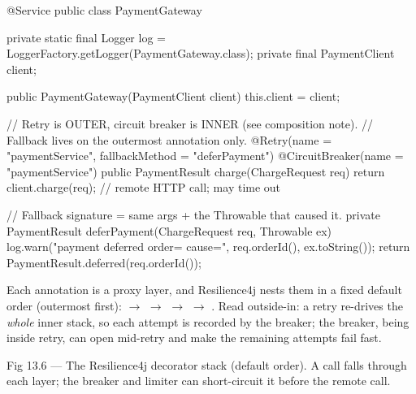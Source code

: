 \begin{javabox}
@Service
public class PaymentGateway {

  private static final Logger log =
      LoggerFactory.getLogger(PaymentGateway.class);
  private final PaymentClient client;

  public PaymentGateway(PaymentClient client) {
    this.client = client;
  }

  // Retry is OUTER, circuit breaker is INNER (see composition note).
  // Fallback lives on the outermost annotation only.
  @Retry(name = "paymentService", fallbackMethod = "deferPayment")
  @CircuitBreaker(name = "paymentService")
  public PaymentResult charge(ChargeRequest req) {
    return client.charge(req);   // remote HTTP call; may time out
  }

  // Fallback signature = same args + the Throwable that caused it.
  private PaymentResult deferPayment(ChargeRequest req, Throwable ex) {
    log.warn("payment deferred order={} cause={}",
             req.orderId(), ex.toString());
    return PaymentResult.deferred(req.orderId());
  }
}
\end{javabox}

 Each annotation is a proxy layer, and Resilience4j nests them in a fixed default order (outermost first):  $\rightarrow$  $\rightarrow$  $\rightarrow$  $\rightarrow$ . Read outside-in: a retry re-drives the \emph{whole} inner stack, so each attempt is recorded by the breaker; the breaker, being inside retry, can open mid-retry and make the remaining attempts fail fast.

\begin{wbfigure}{Fig 13.6 --- The Resilience4j decorator stack (default order). A call falls through each layer; the breaker and limiter can short-circuit it before the remote call.}
\end{wbfigure}

